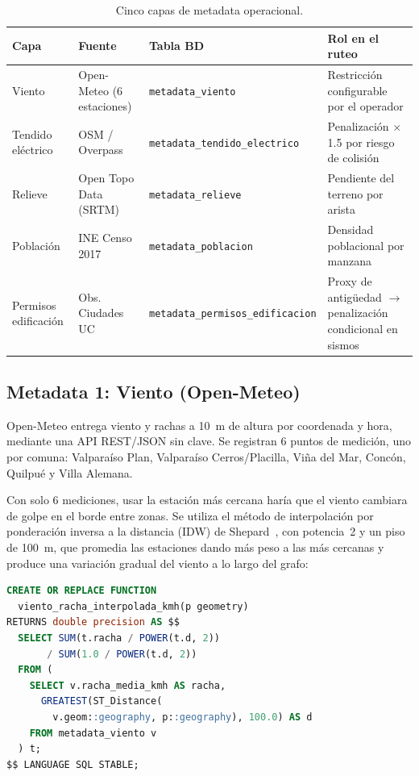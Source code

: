 \documentclass[conference]{IEEEtran}
\begin{document}
\begin{table}[!htbp]
\centering
\caption{Cinco capas de metadata operacional.}
\label{tab:metadata}
\scriptsize
\begin{tabularx}{\columnwidth}{lllX}
\toprule
\textbf{Capa} & \textbf{Fuente} & \textbf{Tabla BD} & \textbf{Rol en el ruteo} \\
\midrule
Viento & Open-Meteo (6 estaciones) & \texttt{metadata\_viento} & Restricción configurable por el operador \\
Tendido eléctrico & OSM / Overpass & \texttt{metadata\_tendido\_electrico} & Penalización $\times$1.5 por riesgo de colisión \\
Relieve & Open Topo Data (SRTM) & \texttt{metadata\_relieve} & Pendiente del terreno por arista \\
Población & INE Censo 2017 & \texttt{metadata\_poblacion} & Densidad poblacional por manzana \\
Permisos edificación & Obs. Ciudades UC & \texttt{metadata\_permisos\_edificacion} & Proxy de antigüedad $\to$ penalización condicional en sismos \\
\bottomrule
\end{tabularx}
\end{table}
\FloatBarrier

\subsection{Metadata 1: Viento (Open-Meteo)}

Open-Meteo entrega viento y rachas a 10~m de altura por coordenada y hora, mediante una API REST/JSON sin clave. Se registran 6 puntos de medición, uno por comuna: Valparaíso Plan, Valparaíso Cerros/Placilla, Viña del Mar, Concón, Quilpué y Villa Alemana.

Con solo 6 mediciones, usar la estación más cercana haría que el viento cambiara de golpe en el borde entre zonas. Se utiliza el método de interpolación por ponderación inversa a la distancia (IDW) de Shepard~\cite{shepard1968}, con potencia~2 y un piso de 100~m, que promedia las estaciones dando más peso a las más cercanas y produce una variación gradual del viento a lo largo del grafo:

\begin{lstlisting}[language=SQL]
CREATE OR REPLACE FUNCTION
  viento_racha_interpolada_kmh(p geometry)
RETURNS double precision AS $$
  SELECT SUM(t.racha / POWER(t.d, 2))
       / SUM(1.0 / POWER(t.d, 2))
  FROM (
    SELECT v.racha_media_kmh AS racha,
      GREATEST(ST_Distance(
        v.geom::geography, p::geography), 100.0) AS d
    FROM metadata_viento v
  ) t;
$$ LANGUAGE SQL STABLE;
\end{lstlisting}
\end{document}
